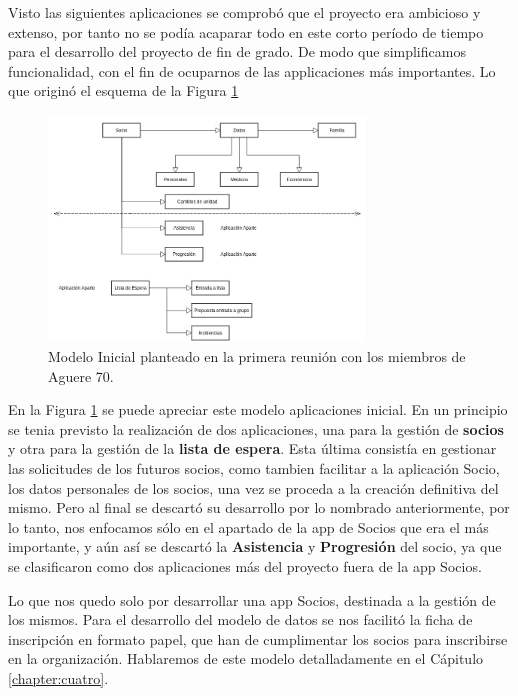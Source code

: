Visto las siguientes aplicaciones se comprobó que el proyecto era ambicioso y extenso,
por tanto no se podía acaparar todo en este corto período de tiempo para el desarrollo del proyecto de fin de grado. De modo que simplificamos funcionalidad,
con el fin de ocuparnos de las applicaciones más importantes. Lo que originó el esquema de la Figura \ref{fig:modelo_inicial}


\begin{figure}[H]
\begin{center}
\includegraphics[width=0.75\textwidth]{images/modelo_inicial.jpg}
\caption{Modelo Inicial planteado en la primera reunión con los miembros de Aguere 70.}
\label{fig:modelo_inicial}
\end{center}
\end{figure}

En la Figura \ref{fig:modelo_inicial} se puede apreciar este modelo aplicaciones inicial. En un principio se tenia previsto la realización de dos aplicaciones, 
una para la gestión de \textbf{socios} y otra para la gestión de la \textbf{lista de espera}. Esta última consistía en gestionar las solicitudes de los
futuros socios, como tambien facilitar a la aplicación Socio, los datos personales de los socios, una vez se proceda a la creación definitiva del mismo.
Pero al final se descartó su desarrollo por lo nombrado anteriormente, por lo tanto, nos enfocamos sólo en el apartado de la app de Socios que era el más importante, 
y aún así se descartó la \textbf{Asistencia} y \textbf{Progresión} del socio, ya que se clasificaron como dos aplicaciones más del proyecto fuera de la app Socios.

Lo que nos quedo solo por desarrollar una app Socios, destinada a la gestión de los mismos. Para el desarrollo del modelo de datos se nos facilitó
la ficha de inscripción en formato papel, que han de cumplimentar los socios para inscribirse en la organización. Hablaremos de este modelo detalladamente en el Cápitulo \ref{chapter:cuatro}.


